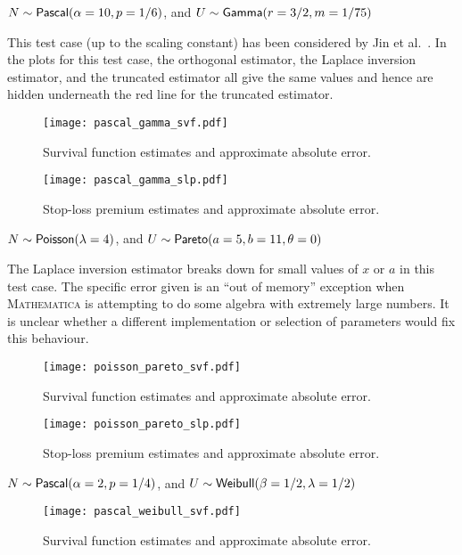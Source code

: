 \begin{test}
$N\sim\mathsf{Pascal}(\alpha=10,p=1/6)$, and $U\sim\mathsf{Gamma}(r=3/2,m=1/75)$
\end{test}

This test case (up to the scaling constant) has been considered by Jin et al.\ \cite[Example 3]{JiPrRe16}. In the plots for this test case, the orthogonal estimator, the Laplace inversion estimator, and the truncated estimator all give the same values and hence are hidden underneath the red line for the truncated estimator.

\begin{figure}[H]
\centering
\texttt{[image: pascal\_gamma\_svf.pdf]}
\caption{Survival function estimates and approximate absolute error.}
\end{figure}

\begin{figure}[H]
\centering
\texttt{[image: pascal\_gamma\_slp.pdf]}
\caption{Stop-loss premium estimates and approximate absolute error.}
\end{figure}

\begin{test} \label{test:poiss_pareto} $N\sim\mathsf{Poisson}(\lambda=4)$, and $U\sim\mathsf{Pareto}(a=5,b=11,\theta=0)$
\end{test}
The Laplace inversion estimator breaks down for small values of $x$ or $a$ in this test case. The specific error given is an ``out of memory'' exception when \textsc{Mathematica} is attempting to do some algebra with extremely large numbers. It is unclear whether a different implementation or selection of parameters would fix this behaviour.

\begin{figure}[H]
\centering
\texttt{[image: poisson\_pareto\_svf.pdf]}
\caption{Survival function estimates and approximate absolute error.}
\end{figure}

\begin{figure}[H]
\centering
\texttt{[image: poisson\_pareto\_slp.pdf]}
\caption{Stop-loss premium estimates and approximate absolute error.}
\end{figure}

\begin{test} $N \sim \mathsf{Pascal}(\alpha=2,p=1/4)$, and $U \sim \mathsf{Weibull}(\beta=1/2,\lambda=1/2)$
\end{test}

\begin{figure}[H]
\centering
\texttt{[image: pascal\_weibull\_svf.pdf]}
\caption{Survival function estimates and approximate absolute error.}
\end{figure}

